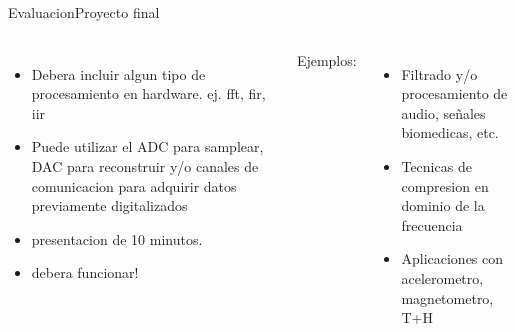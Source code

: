 \begin{frame}{Evaluacion}{Proyecto final}
   \protoboardicon
   \begin{columns}[onlytextwidth]
      \begin{itemize}
         \item Debera incluir algun tipo de procesamiento en hardware. ej. fft, fir, iir
         \item Puede utilizar el ADC para samplear, DAC para reconstruir y/o canales de comunicacion para adquirir datos previamente digitalizados
         \item presentacion de 10 minutos.
         \item debera funcionar!
      \end{itemize}
      Ejemplos:
      \begin{itemize}
         \item Filtrado y/o procesamiento de audio, señales biomedicas, etc.
         \item Tecnicas de compresion en dominio de la frecuencia
         \item Aplicaciones con acelerometro, magnetometro, T+H
      \end{itemize}
   \end{columns}
   \vfill
\end{frame}
